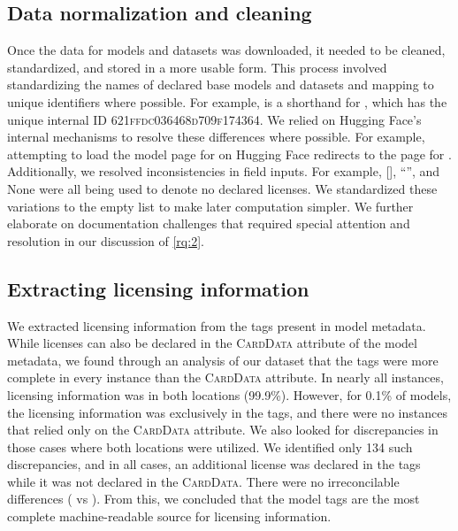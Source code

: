 

\subsection{Data normalization and cleaning}
Once the data for models and datasets was downloaded, it needed to be cleaned, standardized, and stored in a more usable form.  This process involved standardizing the names of declared base models and datasets 
and mapping to unique identifiers where possible. 
For example,  is a shorthand for , which has the unique internal ID \textsc{621ffdc036468d709f174364}. We relied on Hugging Face's internal mechanisms to resolve these differences where possible. For example, attempting to load the model page for  on Hugging Face redirects to the page for . Additionally, we resolved inconsistencies in field inputs. For example, [], ``'', and None were all being used to denote no declared licenses. We standardized these variations to the empty list to make later computation simpler. %
We further elaborate on documentation challenges that required special attention and resolution in our discussion of \ref{rq:2}. %

\subsection{Extracting licensing information}
\label{sec:license_extraction}
We extracted licensing information from the tags present in model metadata. While licenses can also be declared in the \textsc{CardData} attribute of the model metadata, we found through an analysis of our dataset that the tags were more complete in every instance than the \textsc{CardData} attribute.  %
In nearly all instances, licensing information was in both locations (99.9\%). However, for 0.1\% of models, the licensing information was exclusively in the tags, and there were no instances that relied only on the \textsc{CardData} attribute.  We also looked for discrepancies in those cases where both locations were utilized.  We identified only 134 such discrepancies, and in all cases, an additional license was declared in the tags while it was not declared in the \textsc{CardData}. There were no irreconcilable differences (\ie {} vs ).  From this, we concluded that the model tags are the most complete machine-readable source for licensing information.%

